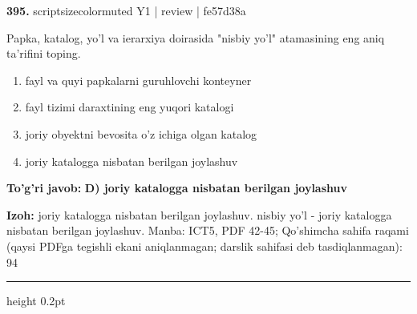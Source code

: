 \documentclass[10pt,a4paper]{article}
\begin{document}
{\bfseries\sffamily\color{ink} 395.} {scriptsizecolor{muted} Y1 | review | fe57d38a}
\par
Papka, katalog, yo'l va ierarxiya doirasida "nisbiy yo'l" atamasining eng aniq ta'rifini toping.
\begin{enumerate}[label=\Alph*),leftmargin=9mm]
\item fayl va quyi papkalarni guruhlovchi konteyner
\item fayl tizimi daraxtining eng yuqori katalogi
\item joriy obyektni bevosita o'z ichiga olgan katalog
\item joriy katalogga nisbatan berilgan joylashuv
\end{enumerate}
\begin{tcolorbox}[enhanced,breakable,colback=teal!4,colframe=teal!60!black,boxrule=0.45pt,arc=1.2mm,left=2.7mm,right=2.7mm,top=1.8mm,bottom=1.8mm,before skip=2mm,after skip=2mm]
{\bfseries\sffamily\color{teal}To'g'ri javob:} \textbf{D) joriy katalogga nisbatan berilgan joylashuv}
\par\smallskip
{\bfseries Izoh:} joriy katalogga nisbatan berilgan joylashuv. nisbiy yo'l - joriy katalogga nisbatan berilgan joylashuv. Manba: ICT5, PDF 42-45; Qo'shimcha sahifa raqami (qaysi PDFga tegishli ekani aniqlanmagan; darslik sahifasi deb tasdiqlanmagan): 94
\end{tcolorbox}
\vspace{2mm}\hrule height 0.2pt\vspace{3mm}
\end{document}

